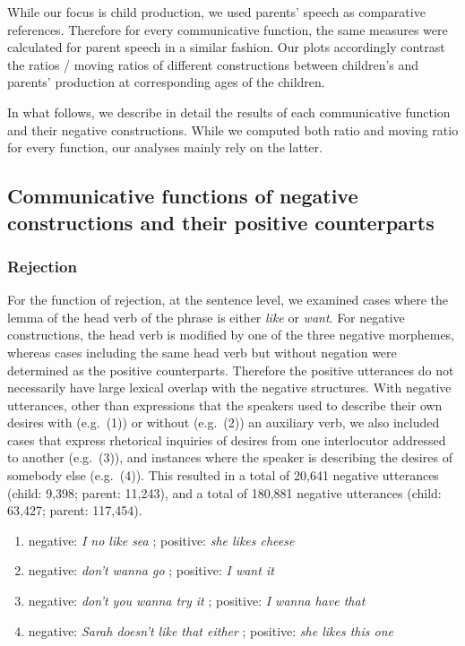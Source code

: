 \documentclass[
  english,
  man,floatsintext]{apa6}
\providecommand{\tightlist}{%
  \setlength{\itemsep}{0pt}\setlength{\parskip}{0pt}}
\begin{document}
While our focus is child production, we used parents' speech as comparative references. Therefore for every communicative function, the same measures were calculated for parent speech in a similar fashion. Our plots accordingly contrast the ratios / moving ratios of different constructions between children's and parents' production at corresponding ages of the children.

In what follows, we describe in detail the results of each communicative function and their negative constructions. While we computed both ratio and moving ratio for every function, our analyses mainly rely on the latter.

\hypertarget{communicative-functions-of-negative-constructions-and-their-positive-counterparts}{%
\subsection{Communicative functions of negative constructions and their positive counterparts}\label{communicative-functions-of-negative-constructions-and-their-positive-counterparts}}

\hypertarget{rejection}{%
\subsubsection{Rejection}\label{rejection}}

For the function of rejection, at the sentence level, we examined cases where the lemma of the head verb of the phrase is either \emph{like} or \emph{want}. For negative constructions, the head verb is modified by one of the three negative morphemes, whereas cases including the same head verb but without negation were determined as the positive counterparts. Therefore the positive utterances do not necessarily have large lexical overlap with the negative structures. With negative utterances, other than expressions that the speakers used to describe their own desires with (e.g.~(1)) or without (e.g.~(2)) an auxiliary verb, we also included cases that express rhetorical inquiries of desires from one interlocutor addressed to another (e.g.~(3)), and instances where the speaker is describing the desires of somebody else (e.g.~(4)). This resulted in a total of 20,641 negative utterances (child: 9,398; parent: 11,243), and a total of 180,881 negative utterances (child: 63,427; parent: 117,454).

\begin{enumerate}
\def\labelenumi{(\arabic{enumi})}
\tightlist
\item
  negative: \emph{I no like sea} ; positive: \emph{she likes cheese}
\item
  negative: \emph{don't wanna go} ; positive: \emph{I want it}
\item
  negative: \emph{don't you wanna try it} ; positive: \emph{I wanna have that}
\item
  negative: \emph{Sarah doesn't like that either} ; positive: \emph{she likes this one}
\end{enumerate}
\end{document}
